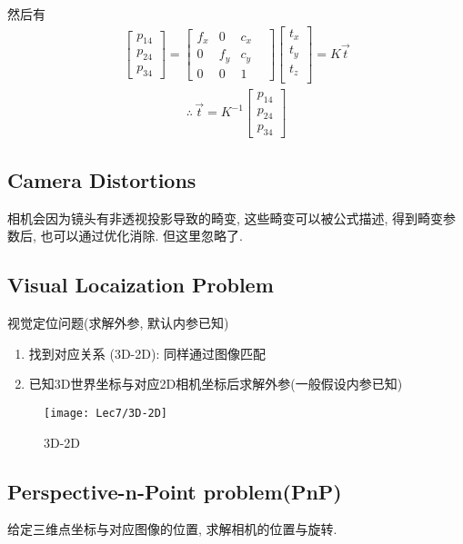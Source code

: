 然后有
\begin{align*}
    \begin{bmatrix}
        p_{14} \\
        p_{24} \\
        p_{34}
    \end{bmatrix}=\begin{bmatrix}
        f_x &0&c_x\\
        0&f_y&c_y\\
        0&0&1&
    \end{bmatrix}\begin{bmatrix}
        t_x\\
        t_y\\
        t_z\\
    \end{bmatrix}=K\vec{t}
\end{align*}
\begin{align*}
    \therefore \,  \vec{t}=K^{-1}\begin{bmatrix}
        p_{14} \\
        p_{24} \\
        p_{34}
    \end{bmatrix}
\end{align*}

\subsection{Camera Distortions}
相机会因为镜头有非透视投影导致的畸变, 这些畸变可以被公式描述, 得到畸变参数后, 也可以通过优化消除. 但这里忽略了. 

\subsection{Visual Locaization Problem}
视觉定位问题(求解外参, 默认内参已知)

\begin{enumerate}
    \item 找到对应关系 (3D-2D): 同样通过图像匹配
    \item 已知3D世界坐标与对应2D相机坐标后求解外参(一般假设内参已知) 
\end{enumerate}

\begin{figure}[H]
    \centering
    \texttt{[image: Lec7/3D-2D]}
    \caption{3D-2D}
\end{figure}

\subsection{Perspective-n-Point problem(PnP)}
给定三维点坐标与对应图像的位置, 求解相机的位置与旋转. 

